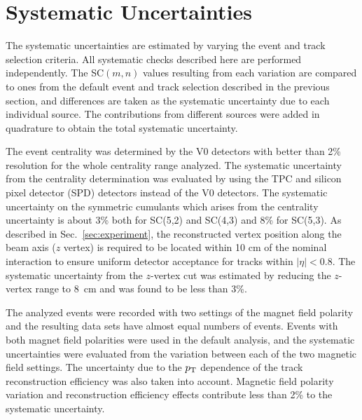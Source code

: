 \section{Systematic Uncertainties}
\label{sec:uncertainties}
The systematic uncertainties are estimated by varying the event and track selection criteria. All systematic checks described here are performed independently. 
The SC$(m,n)$ values resulting from each variation are compared to ones from the default event and track selection described in the previous section,
and differences are taken as the systematic uncertainty due to each individual source.
The contributions from different sources were added in quadrature to obtain the total systematic uncertainty.

The event centrality was determined by the V0 detectors \cite{Abbas:2013taa} with better than 2\%  resolution for the whole centrality range analyzed. The systematic uncertainty from the centrality determination was evaluated by using the TPC and silicon pixel detector (SPD) \cite{Dellacasa:1999kf} detectors instead of the V0 detectors. 
The systematic uncertainty on the symmetric cumulants which arises from the centrality uncertainty is about 3\% both for SC(5,2) and SC(4,3) and 8\% for  SC(5,3).
As described in Sec.~\ref{sec:experiment}, the reconstructed vertex position along the beam axis ($z$ vertex) is required to be located within 10 cm of the nominal interaction to ensure uniform detector acceptance for tracks within $|\eta|<0.8$. The systematic uncertainty from the $z$-vertex cut was estimated by reducing the $z$-vertex range to 8~cm and was found to be less than 3\%.  

The analyzed events were recorded with two settings of the magnet field polarity and the resulting data sets have almost equal numbers of events. Events with both magnet field polarities were used in the default analysis, and the systematic uncertainties were evaluated from the variation between each of the two magnetic field settings. 
The uncertainty due to the $p_{\rm T}$ dependence of the track reconstruction efficiency was also taken into account.
Magnetic field polarity variation and reconstruction efficiency effects contribute less than 2\% to the systematic uncertainty.

